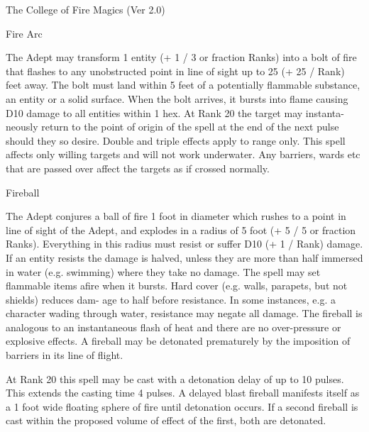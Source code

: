\begin{Chapter}{The College of Fire Magics (Ver 2.0)}
\begin{spell}[S-3]{Fire Arc }
\begin{effects}
The Adept may transform 1 entity (+ 1 / 3 
or fraction Ranks) into a bolt of fire that flashes to 
any unobstructed point in line of sight up to 25 (+ 
25 / Rank) feet away. The bolt must land within 5 
feet of a potentially flammable substance, an entity 
or  a  solid  surface.  When  the  bolt  arrives,  it  bursts 
into  flame  causing  D10  damage  to  all  entities 
within  1  hex.  At  Rank  20  the  target  may  instanta-
neously return to the point of origin of the  spell at 
the  end  of  the  next  pulse  should  they  so  desire. 
Double and triple effects apply to range only. This 
spell affects only willing targets and will not work 
underwater. Any barriers, wards etc that are passed 
over affect the targets as if crossed normally. 

\end{effects}
\end{spell}

\begin{spell}[S-4]{Fireball }

\begin{effects}
The Adept conjures a ball of fire 1 foot in 
diameter which rushes to a point in line of sight of 
the Adept, and explodes in a radius of 5 foot (+ 5 / 
5 or fraction Ranks). Everything in this radius must 
resist  or  suffer  D10  (+  1  /  Rank)  damage.  If  an 
entity resists the damage is halved, unless they are 
more than half immersed in water (e.g. swimming) 
where  they  take  no  damage.  The  spell  may  set 
flammable  items  afire  when  it  bursts.  Hard  cover 
(e.g. walls, parapets, but not shields) reduces dam-
age  to  half  before  resistance.  In  some  instances, 
e.g.  a  character  wading  through  water,  resistance 
may negate all damage. The fireball is analogous to 
an  instantaneous  flash  of  heat  and  there  are  no 
over-pressure  or  explosive  effects.  A  fireball  may 
be  detonated  prematurely  by  the  imposition  of 
barriers in its line of flight. 

At Rank 20 this spell may be cast with a detonation 
delay  of  up  to  10  pulses.  This  extends  the  casting 
time  4  pulses.  A  delayed  blast  fireball  manifests 
itself  as  a  1  foot  wide  floating  sphere  of  fire  until 
detonation occurs. If a second fireball is cast within 
the proposed volume of effect of the first, both are 
detonated. 


\end{effects}
\end{spell}
\end{Chapter}
